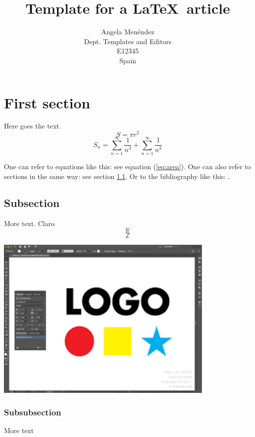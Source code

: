 \documentclass[12pt,a4paper]{article}
\title{Template for a \LaTeX\ article}
\author{Angela Menéndez\\
  \small Dept. Templates and Editors\\
  \small E12345\\
  \small Spain
}
\theoremstyle{definition}
\theoremstyle{remark}
\def\RR{\mathbb{R}}
\def\ZZ{\mathbb{Z}}
\begin{document}
\maketitle


\section{First section}

Here goes the text.
\begin{equation}\label{eq:area}
  S = \pi r^2
\end{equation}
\[S_n = \sum_{n=1}^{\infty} \frac{1}{n^3} + \sum_{n=1}^{\infty} \frac{1}{n^3}\] 

One can refer to equations like this: see equation (\ref{eq:area}). One can also
refer to sections in the same way: see section \ref{sec:nothing}. Or
to the bibliography like this: \cite{Cd94}.

\subsection{Subsection}\label{sec:nothing}

More text. Claro 
\[\RR\]
\[\ZZ\]

\includegraphics[width=0.8\textwidth]{./figs/drawing.png}

\subsubsection{Subsubsection}\label{sec:nothing2}

More text
\end{document}
